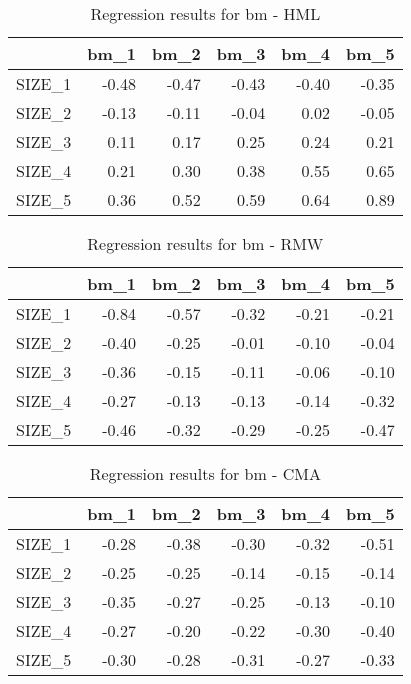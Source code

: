 \begin{table}[ht]
\centering
\caption{Regression results for bm - HML} 
\begin{tabular}{rrrrrr}
  \hline
 & bm\_1 & bm\_2 & bm\_3 & bm\_4 & bm\_5 \\ 
  \hline
SIZE\_1 & -0.48 & -0.47 & -0.43 & -0.40 & -0.35 \\ 
  SIZE\_2 & -0.13 & -0.11 & -0.04 & 0.02 & -0.05 \\ 
  SIZE\_3 & 0.11 & 0.17 & 0.25 & 0.24 & 0.21 \\ 
  SIZE\_4 & 0.21 & 0.30 & 0.38 & 0.55 & 0.65 \\ 
  SIZE\_5 & 0.36 & 0.52 & 0.59 & 0.64 & 0.89 \\ 
   \hline
\end{tabular}
\end{table}


\begin{table}[ht]
\centering
\caption{Regression results for bm - RMW} 
\begin{tabular}{rrrrrr}
  \hline
 & bm\_1 & bm\_2 & bm\_3 & bm\_4 & bm\_5 \\ 
  \hline
SIZE\_1 & -0.84 & -0.57 & -0.32 & -0.21 & -0.21 \\ 
  SIZE\_2 & -0.40 & -0.25 & -0.01 & -0.10 & -0.04 \\ 
  SIZE\_3 & -0.36 & -0.15 & -0.11 & -0.06 & -0.10 \\ 
  SIZE\_4 & -0.27 & -0.13 & -0.13 & -0.14 & -0.32 \\ 
  SIZE\_5 & -0.46 & -0.32 & -0.29 & -0.25 & -0.47 \\ 
   \hline
\end{tabular}
\end{table}


\begin{table}[ht]
\centering
\caption{Regression results for bm - CMA} 
\begin{tabular}{rrrrrr}
  \hline
 & bm\_1 & bm\_2 & bm\_3 & bm\_4 & bm\_5 \\ 
  \hline
SIZE\_1 & -0.28 & -0.38 & -0.30 & -0.32 & -0.51 \\ 
  SIZE\_2 & -0.25 & -0.25 & -0.14 & -0.15 & -0.14 \\ 
  SIZE\_3 & -0.35 & -0.27 & -0.25 & -0.13 & -0.10 \\ 
  SIZE\_4 & -0.27 & -0.20 & -0.22 & -0.30 & -0.40 \\ 
  SIZE\_5 & -0.30 & -0.28 & -0.31 & -0.27 & -0.33 \\ 
   \hline
\end{tabular}
\end{table}


